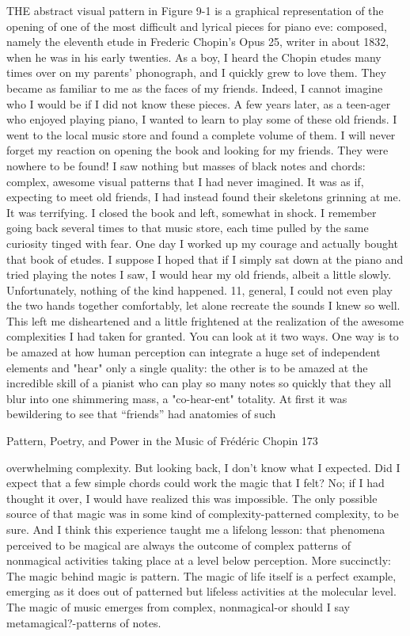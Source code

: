 THE abstract visual pattern in Figure 9-1 is a graphical representation of the opening
of one of the most difficult and lyrical pieces for piano eve: composed, namely the
eleventh etude in Frederic Chopin's Opus 25, writer in about 1832, when he was in his
early twenties. As a boy, I heard the Chopin etudes many times over on my parents'
phonograph, and I quickly grew to love them. They became as familiar to me as the faces
of my friends. Indeed, I cannot imagine who I would be if I did not know these pieces.
          A few years later, as a teen-ager who enjoyed playing piano, I wanted to learn to
play some of these old friends. I went to the local music store and found a complete
volume of them. I will never forget my reaction on opening the book and looking for my
friends. They were nowhere to be found! I saw nothing but masses of black notes and
chords: complex, awesome visual patterns that I had never imagined. It was as if,
expecting to meet old friends, I had instead found their skeletons grinning at me. It was
terrifying. I closed the book and left, somewhat in shock.
          I remember going back several times to that music store, each time pulled by the
same curiosity tinged with fear. One day I worked up my courage and actually bought
that book of etudes. I suppose I hoped that if I simply sat down at the piano and tried
playing the notes I saw, I would hear my old friends, albeit a little slowly. Unfortunately,
nothing of the kind happened. 11, general, I could not even play the two hands together
comfortably, let alone recreate the sounds I knew so well. This left me disheartened and a
little frightened at the realization of the awesome complexities I had taken for granted.
You can look at it two ways. One way is to be amazed at how human perception can
integrate a huge set of independent elements and "hear" only a single quality: the other is
to be amazed at the incredible skill of a pianist who can play so many notes so quickly
that they all blur into one shimmering mass, a "co-hear-ent" totality.
          At first it was bewildering to see that “friends” had anatomies of such




Pattern, Poetry, and Power in the Music of Frédéric Chopin                              173

overwhelming complexity. But looking back, I don't know what I expected. Did I expect
that a few simple chords could work the magic that I felt? No; if I had thought it over, I
would have realized this was impossible. The only possible source of that magic was in
some kind of complexity-patterned complexity, to be sure. And I think this experience
taught me a lifelong lesson: that phenomena perceived to be magical are always the
outcome of complex patterns of nonmagical activities taking place at a level below
perception. More succinctly: The magic behind magic is pattern. The magic of life itself
is a perfect example, emerging as it does out of patterned but lifeless activities at the
molecular level. The magic of music emerges from complex, nonmagical-or should I say
metamagical?-patterns of notes.

